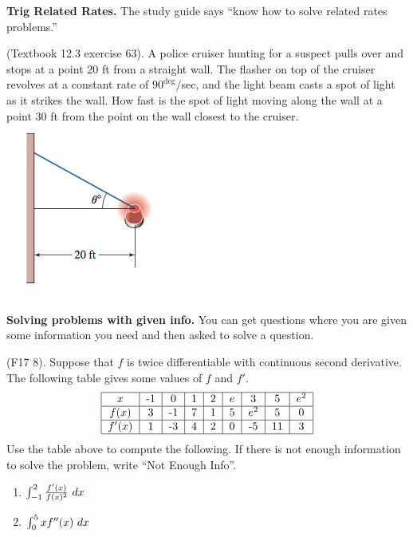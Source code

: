 \documentclass[12pt, a4paper]{article}
\begin{document}
\textbf{Trig Related Rates.} The study guide says ``know how to solve related rates problems.''
\begin{ex}
  (Textbook 12.3 exercise 63). A police cruiser hunting for a suspect
  pulls over and stops at a point \(20\) ft from a straight wall. The
  flasher on top of the cruiser revolves at a constant rate of
  \(90^\deg /\)sec, and the light beam casts a spot of light as it
  strikes the wall. How fast is the spot of light moving along the
  wall at a point \(30\) ft from the point on the wall closest to the
  cruiser. \\
  \includegraphics[scale=0.6]{images/police-cruiser}
\end{ex}
\textbf{Solving problems with given info.} You can get questions where
you are given some information you need and then asked to solve a question.
\begin{ex}
  (F17 8). Suppose that \(f\) is twice differentiable with continuous second
  derivative. The following table gives some values of \(f\) and \(f'\).\[
  \begin{tabular}{|c|c|c|c|c|c|c|c|c|}
    \hline \(x\)&-1&0&1&2&\(e\)&3&5&\(e^2\)\\
    \hline \(f(x)\)&3&-1&7&1&5&\(e^2\)&5&0\\
    \hline \(f'(x)\)&1&-3&4&2&0&-5&11&3\\
    \hline
  \end{tabular}
\]
Use the table above to compute the following. If there is not enough
information to solve the problem, write ``Not Enough Info''.
\begin{enumerate}
\item \(\int_{-1}^2 \frac{f'(x)}{f(x)^2} \ d x\)
\item \(\int_0^5 xf''(x)\ d x\)
\end{enumerate}
\end{ex}
\end{document}
